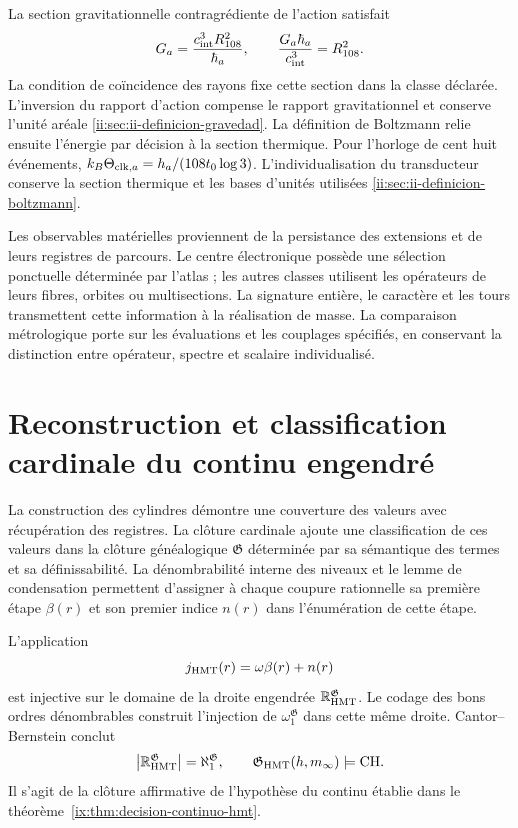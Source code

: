 La section gravitationnelle contragrédiente de l’action satisfait
\[
 G_a=\frac{c_{\rm int}^{3}R_{108}^{2}}{\hbar_a},
 \qquad
 \frac{G_a\hbar_a}{c_{\rm int}^{3}}=R_{108}^{2}.
\]
La condition de coïncidence des rayons fixe cette section dans la classe déclarée. L’inversion du rapport d’action compense le rapport gravitationnel et conserve l’unité aréale \ref{ii:sec:ii-definicion-gravedad}. La définition de Boltzmann relie ensuite l’énergie par décision à la section thermique. Pour l’horloge de cent huit événements, \(k_B\Theta_{{\rm clk},a}=h_a/(108t_0\log3)\). L’individualisation du transducteur conserve la section thermique et les bases d’unités utilisées \ref{ii:sec:ii-definicion-boltzmann}.

Les observables matérielles proviennent de la persistance des extensions et de leurs registres de parcours. Le centre électronique possède une sélection ponctuelle déterminée par l’atlas ; les autres classes utilisent les opérateurs de leurs fibres, orbites ou multisections. La signature entière, le caractère et les tours transmettent cette information à la réalisation de masse. La comparaison métrologique porte sur les évaluations et les couplages spécifiés, en conservant la distinction entre opérateur, spectre et scalaire individualisé.

\section{Reconstruction et classification cardinale du continu engendré}

La construction des cylindres démontre une couverture des valeurs avec récupération des registres. La clôture cardinale ajoute une classification de ces valeurs dans la clôture généalogique \(\mathfrak G\) déterminée par sa sémantique des termes et sa définissabilité. La dénombrabilité interne des niveaux et le lemme de condensation permettent d’assigner à chaque coupure rationnelle sa première étape \(\beta(r)\) et son premier indice \(n(r)\) dans l’énumération de cette étape.

L'application
\[
 j_{\rm HMT}(r)=\omega\beta(r)+n(r)
\]
est injective sur le domaine de la droite engendrée \(\mathbb R_{\rm HMT}^{\mathfrak G}\). Le codage des bons ordres dénombrables construit l’injection de \(\omega_1^{\mathfrak G}\) dans cette même droite. Cantor--Bernstein conclut
\[
 \left|\mathbb R_{\rm HMT}^{\mathfrak G}\right|
 =\aleph_1^{\mathfrak G},
 \qquad
 \mathfrak G_{\rm HMT}(h,m_\infty)
 \models\mathrm{CH}.
\]
Il s’agit de la clôture affirmative de l’hypothèse du continu établie dans le théorème~\ref{ix:thm:decision-continuo-hmt}.

